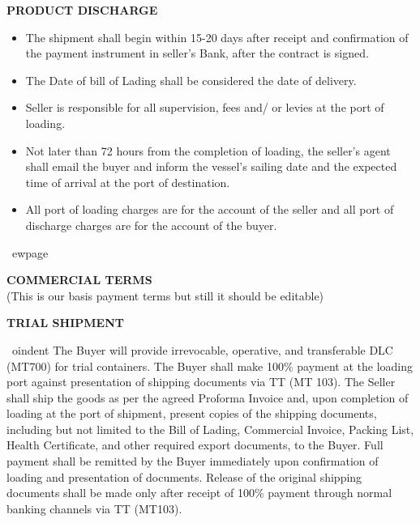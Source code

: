 \documentclass[a4paper,11pt]{article}
\begin{document}
\vspace{0.3cm}

\begin{center}{\large\textbf{\color{marooncolor}PRODUCT DISCHARGE}}\end{center}
\vspace{0.1cm}
\begin{itemize}[leftmargin=1.5em, itemsep=2pt, topsep=2pt]
\item The shipment shall begin within 15-20 days after receipt and confirmation of the payment instrument in seller's Bank, after the contract is signed.
\item The Date of bill of Lading shall be considered the date of delivery.
\item Seller is responsible for all supervision, fees and/ or levies at the port of loading.
\item Not later than 72 hours from the completion of loading, the seller's agent shall email the buyer and inform the vessel's sailing date and the expected time of arrival at the port of destination.
\item All port of loading charges are for the account of the seller and all port of discharge charges are for the account of the buyer.
\end{itemize}

\
ewpage

\begin{center}
  {\large\textbf{\color{marooncolor}COMMERCIAL TERMS}}\\[4pt]
  {\small\color{marooncolor}(This is our basis payment terms but still it should be editable)}
\end{center}
\vspace{0.2cm}

\begin{center}{\large\textbf{\color{marooncolor}TRIAL SHIPMENT}}\end{center}
\vspace{0.1cm}
\
oindent The Buyer will provide irrevocable, operative, and transferable DLC (MT700) for trial containers. The Buyer shall make 100\% payment at the loading port against presentation of shipping documents via TT (MT 103). The Seller shall ship the goods as per the agreed Proforma Invoice and, upon completion of loading at the port of shipment, present copies of the shipping documents, including but not limited to the Bill of Lading, Commercial Invoice, Packing List, Health Certificate, and other required export documents, to the Buyer. Full payment shall be remitted by the Buyer immediately upon confirmation of loading and presentation of documents. Release of the original shipping documents shall be made only after receipt of 100\% payment through normal banking channels via TT (MT103).
\end{document}
